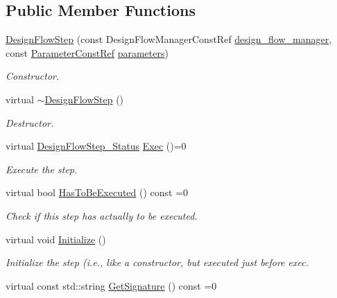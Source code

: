 \subsection*{Public Member Functions}
\begin{DoxyCompactItemize}
\item 
\hyperlink{classDesignFlowStep_a5ae5a1314a6de081e44f0a89ce4d16ab}{Design\+Flow\+Step} (const Design\+Flow\+Manager\+Const\+Ref \hyperlink{classDesignFlowStep_ab770677ddf087613add30024e16a5554}{design\+\_\+flow\+\_\+manager}, const \hyperlink{Parameter_8hpp_a37841774a6fcb479b597fdf8955eb4ea}{Parameter\+Const\+Ref} \hyperlink{classDesignFlowStep_a802eaafe8013df706370679d1a436949}{parameters})
\begin{DoxyCompactList}\small\item\em Constructor. \end{DoxyCompactList}\item 
virtual \hyperlink{classDesignFlowStep_a1145a27e25a0afbe24eed50403ca0e6a}{$\sim$\+Design\+Flow\+Step} ()
\begin{DoxyCompactList}\small\item\em Destructor. \end{DoxyCompactList}\item 
virtual \hyperlink{design__flow__step_8hpp_afb1f0d73069c26076b8d31dbc8ebecdf}{Design\+Flow\+Step\+\_\+\+Status} \hyperlink{classDesignFlowStep_a77d7e38493016766098711ea24f60b89}{Exec} ()=0
\begin{DoxyCompactList}\small\item\em Execute the step. \end{DoxyCompactList}\item 
virtual bool \hyperlink{classDesignFlowStep_a1783abe0c1d162a52da1e413d5d1ef05}{Has\+To\+Be\+Executed} () const =0
\begin{DoxyCompactList}\small\item\em Check if this step has actually to be executed. \end{DoxyCompactList}\item 
virtual void \hyperlink{classDesignFlowStep_a44b50683382a094976e1d432a7784799}{Initialize} ()
\begin{DoxyCompactList}\small\item\em Initialize the step (i.\+e., like a constructor, but executed just before exec. \end{DoxyCompactList}\item 
virtual const std\+::string \hyperlink{classDesignFlowStep_ab111e3d4058615c2dedc0505978d4699}{Get\+Signature} () const =0

\end{DoxyCompactItemize}
